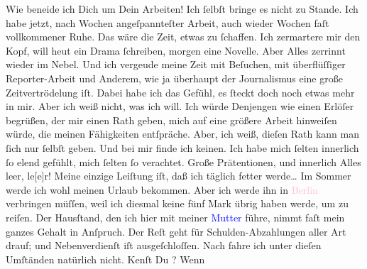            \pstart
           Wie beneide ich Dich um Dein Arbeiten! Ich ſelbſt bringe es nicht zu Stande. Ich habe
               jetzt, nach Wochen angeſpannteſter Arbeit, auch wieder Wochen faſt vollkommener Ruhe.
               Das wäre die Zeit, etwas zu ſchaffen. Ich zermartere mir den Kopf, will heut ein
               Drama ſchreiben, morgen eine Novelle. Aber Alles {\pb}zerrinnt wieder im Nebel. Und ich vergeude meine Zeit mit Beſuchen, mit
               überflüſſiger Reporter-Arbeit und Anderem, wie ja überhaupt der Journalismus eine
               große Zeitvertrödelung iſt. Dabei habe ich das Gefühl, es ſteckt doch noch etwas mehr
               in mir. Aber ich weiß nicht, was ich will. Ich würde Denjengen\strikeout{,} wie einen Erlöſer begrüßen, der mir einen Rath geben,
               mich auf eine größere Arbeit hinweiſen würde, die  meinen Fähigkeiten entſpräche. Aber, ich weiß, dieſen Rath kann man ſich nur
               ſelbſt geben. Und bei mir finde ich keinen. Ich habe mich ſelten innerlich ſo elend
               gefühlt, mich ſelten ſo verachtet. Große Prätentionen, und innerlich {\pb}Alles leer, le{[}e{]}r! Meine einzige
               Leiſtung iſt, daß ich täglich fetter werde{\dots}\pend
           \pstart
           Im Sommer werde ich wohl meinen Urlaub bekommen. Aber ich werde ihn in \textcolor{pink}{Berlin}{}\ledrightnote{\textcolor{pink}{Berlin}} verbringen müſſen, weil ich diesmal keine
               fünf Mark übrig haben werde, um zu reiſen. Der Hausſtand, den ich hier mit meiner \textcolor{blue}{Mutter}{}\ledrightnote{{$\rightarrow$}\textcolor{blue}{Clementine Goldmann}} führe,  nimmt faſt mein ganzes Gehalt in Anſpruch. Der Reſt
               geht für Schulden-Abzahlungen aller Art drauf; und Nebenverdienſt iſt ausgeſchloſſen.
               Nach \label{K_L02911-5v}\label{K_L02911-5h} fahre ich unter dieſen
               Umſtänden natürlich nicht.\pend
           \pstart
           {\pb}Kenſt Du \label{K_L02911-42v}\label{K_L02911-42h}? Wenn
